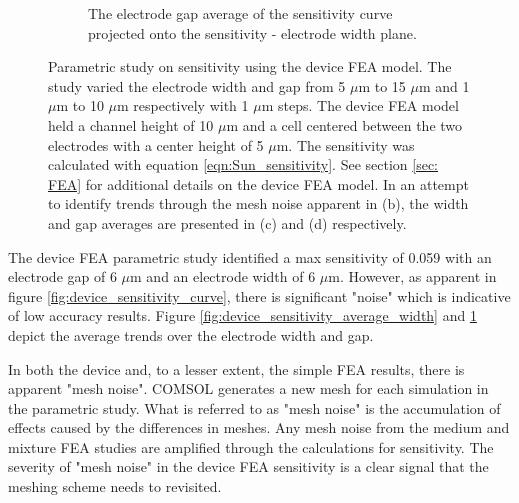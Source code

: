 \begin{figure}[h]
\begin{subfigure}[b]{0.49\textwidth}
        \caption{The electrode gap average of the sensitivity curve projected onto the sensitivity - electrode width plane.}
        \label{fig:device_sensitivity_average_gap}
    \end{subfigure}
    \caption[Device sensitivity]{Parametric study on sensitivity using the device FEA model. The study varied the electrode width and gap from 5 $\mu$m to 15 $\mu$m and 1 $\mu$m to 10 $\mu$m respectively with 1 $\mu$m steps. The device FEA model held a channel height of 10 $\mu$m and a cell centered between the two electrodes with a center height of 5 $\mu$m. The sensitivity was calculated with equation \ref{eqn:Sun_sensitivity}. See section \ref{sec: FEA} for additional details on the device FEA model. In an attempt to identify trends through the mesh noise apparent in (b), the width and gap averages are presented in (c) and (d) respectively.}
    \label{fig:device_sensitivity}
\end{figure}

\par The device FEA parametric study identified a max sensitivity of 0.059 with an electrode gap of 6 $\mu$m and an electrode width of 6 $\mu$m. However, as apparent in figure \ref{fig:device_sensitivity_curve}, there is significant "noise" which is indicative of low accuracy results. Figure \ref{fig:device_sensitivity_average_width} and \ref{fig:device_sensitivity_average_gap} depict the average trends over the electrode width and gap.



\par In both the device and, to a lesser extent, the simple FEA results, there is apparent "mesh noise". COMSOL generates a new mesh for each simulation in the parametric study. What is referred to as "mesh noise" is the accumulation of effects caused by the differences in meshes. Any mesh noise from the medium and mixture FEA studies are amplified through the calculations for sensitivity. The severity of "mesh noise" in the device FEA sensitivity is a clear signal that the meshing scheme needs to revisited.

